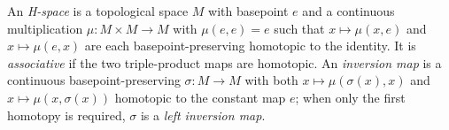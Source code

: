 \hypertarget{def:h-space-left-inversion}{}%
\begin{definition}\label{def:h-space-left-inversion}
An \emph{H-space} is a topological space $M$ with basepoint
$e$ and a continuous multiplication $\mu\colon M\times M\to M$ with $\mu(e,e)=e$
such that $x\mapsto\mu(x,e)$ and $x\mapsto\mu(e,x)$ are each basepoint-preserving
homotopic to the identity. It is \emph{associative} if the two triple-product maps are
homotopic. An \emph{inversion map} is a continuous basepoint-preserving
$\sigma\colon M\to M$ with both $x\mapsto\mu(\sigma(x),x)$ and
$x\mapsto\mu(x,\sigma(x))$ homotopic to the constant map $e$; when only the first
homotopy is required, $\sigma$ is a \emph{left inversion map}.
\end{definition}
